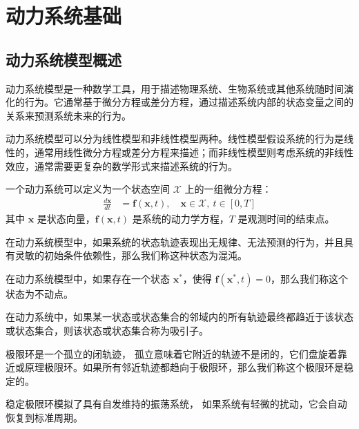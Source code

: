 \chapter{动力系统基础}\label{chap:dynamic}


\section{动力系统模型概述}
动力系统模型是一种数学工具，用于描述物理系统、生物系统或其他系统随时间演化的行为。它通常基于微分方程或差分方程，通过描述系统内部的状态变量之间的关系来预测系统未来的行为。

动力系统模型可以分为线性模型和非线性模型两种。线性模型假设系统的行为是线性的，通常用线性微分方程或差分方程来描述；而非线性模型则考虑系统的非线性效应，通常需要更复杂的数学形式来描述系统的行为。

\begin{defn}[动力系统]
一个动力系统可以定义为一个状态空间 $\mathcal{X}$ 上的一组微分方程：
\begin{align}
\frac{d\mathbf{x}}{dt} &= \mathbf{f}(\mathbf{x}, t), \quad \mathbf{x} \in \mathcal{X}, \ t \in [0, T]
\end{align}
其中 $\mathbf{x}$ 是状态向量，$\mathbf{f}(\mathbf{x}, t)$ 是系统的动力学方程，$T$ 是观测时间的结束点。
\end{defn}

\begin{defn}[混沌]
    在动力系统模型中，如果系统的状态轨迹表现出无规律、无法预测的行为，并且具有灵敏的初始条件依赖性，那么我们称这种状态为混沌。
\end{defn}

\begin{defn}[不动点]
    在动力系统模型中，如果存在一个状态 $\mathbf{x}^*$，使得 $\mathbf{f}(\mathbf{x}^*, t) = 0$，那么我们称这个状态为不动点。
\end{defn}
\begin{defn}[吸引子]
    在动力系统中，如果某一状态或状态集合的邻域内的所有轨迹最终都趋近于该状态或状态集合，则该状态或状态集合称为吸引子。
\end{defn}
    
\begin{defn}[极限环]
    极限环是一个孤立的闭轨迹， 孤立意味着它附近的轨迹不是闭的，它们盘旋着靠近或原理极限环。如果所有邻近轨迹都趋向于极限环，那么我们称这个极限环是稳定的。
\end{defn}

稳定极限环模拟了具有自发维持的振荡系统， 如果系统有轻微的扰动，它会自动恢复到标准周期。

